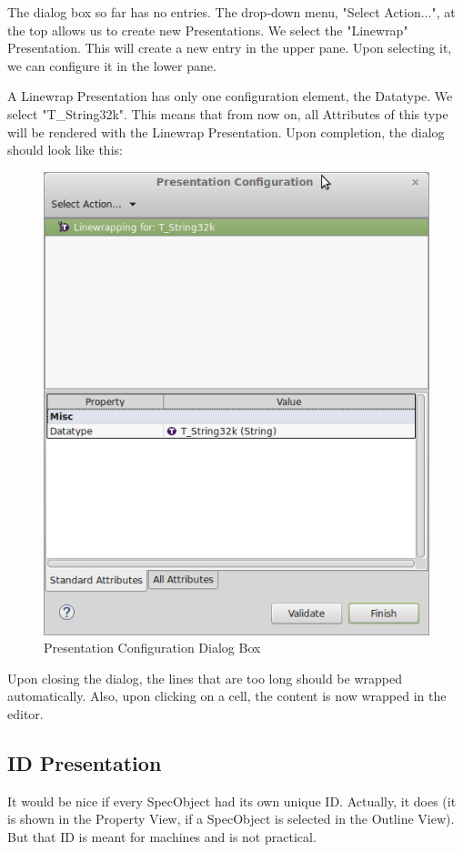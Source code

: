 The dialog box so far has no entries.  The drop-down menu, "Select Action...",
at the top allows us to create new Presentations.  We select the
"Linewrap" Presentation.  This will create a new entry in the upper
pane.  Upon selecting it, we can configure it in the lower pane.

A Linewrap Presentation has only one configuration element, the
Datatype.  We select "T\_String32k".  This means that from now on, all
Attributes of this type will be rendered with the Linewrap Presentation.
Upon completion, the dialog should look like this:

\begin{figure}[h!]
\centering
\includegraphics[width=0.8\linewidth]{../rmf-images/presentationconfig.png}      
\caption{Presentation Configuration Dialog Box}      
\label{fig:presentationConfig}
\end{figure}

Upon closing the dialog, the lines that are too long should be wrapped
automatically.  Also, upon clicking on a cell, the content is now wrapped
in the editor.

\subsection{ID Presentation}

It would be nice if every SpecObject had its own unique ID.  Actually, it
does (it is shown in the Property View, if a SpecObject is selected in
the Outline View).  But that ID is meant for machines and is not
practical.


